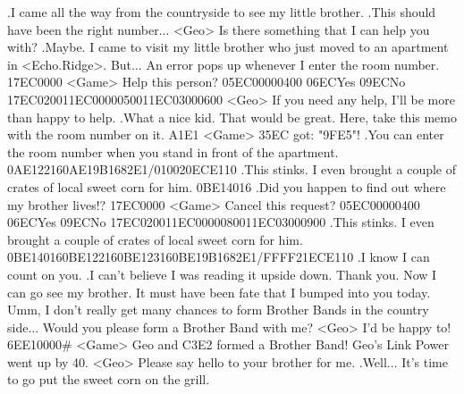 .I came all the way from the countryside to see my little brother. 
.This should have been the right number... 
<Geo> Is there something that I can help you with? 
.Maybe. 
I came to visit my little brother who just moved to an apartment in <Echo.Ridge>. 
But... 
An error pops up whenever I enter the room number. 
{17}{EC}{00}{00} 
<Game> Help this person? {05}{EC}{00}{00}{04}{00}  {06}{EC}Yes   {09}{EC}No 
{17}{EC}{02}{00}{11}{EC}{00}{00}{05}{00}{11}{EC}{03}{00}{06}{00}
<Geo> If you need any help, I'll be more than happy to help. 
.What a nice kid. That would be great. 
Here, take this memo with the room number on it. 
{A1}{E1} 
<Game> {35}{EC} got: "{9F}{E5}"! 
.You can enter the room number when you stand in front of the apartment. 
{0A}{E1}{22}{16}{0A}{E1}{9B}{16}{82}{E1}/{01}{00}{20}{EC}{E1}{10}
.This stinks. 
I even brought a couple of crates of local sweet corn for him. 
{0B}{E1}{40}{16}
.Did you happen to find out where my brother lives!? 
{17}{EC}{00}{00} 
<Game> Cancel this request? {05}{EC}{00}{00}{04}{00}  {06}{EC}Yes   {09}{EC}No 
{17}{EC}{02}{00}{11}{EC}{00}{00}{08}{00}{11}{EC}{03}{00}{09}{00}
.This stinks. 
I even brought a couple of crates of local sweet corn for him. 
{0B}{E1}{40}{16}{0B}{E1}{22}{16}{0B}{E1}{23}{16}{0B}{E1}{9B}{16}{82}{E1}/{FF}{FF}{21}{EC}{E1}{10}
.I know I can count on you. 
.I can't believe I was reading it upside down. 
Thank you. Now I can go see my brother. 
It must have been fate that I bumped into you today. 
Umm, I don't really get many chances to form Brother Bands in the country side... 
Would you please form a Brother Band with me? 
<Geo> I'd be happy to! 
{6E}{E1}{00}{00}# 
<Game> Geo and {C3}{E2} formed a Brother Band! 
Geo's Link Power went up by 40. 
<Geo> Please say hello to your brother for me. 
.Well... 
It's time to go put the sweet corn on the grill. 
